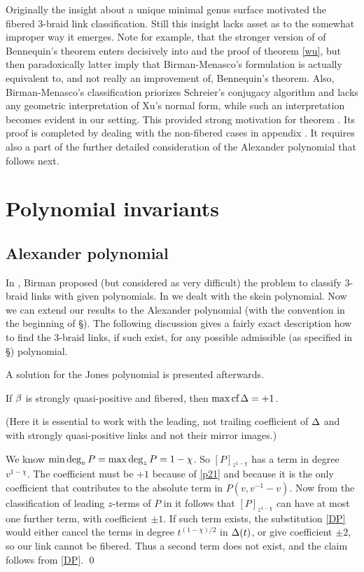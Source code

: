 Originally the insight about a unique minimal genus surface motivated
the fibered 3-braid link classification. Still this insight lacks
asset as to the somewhat improper way it emerges. Note for example,
that the stronger version of \cite{BirMen2} of Bennequin's theorem
enters decisively into \cite{Xu} and the proof of theorem \ref{wu},
but then paradoxically latter imply that Birman-Menasco's formulation
is actually equivalent to, and not really an improvement of,
Bennequin's theorem. Also, Birman-Menasco's classification
\cite{BirMen} priorizes Schreier's conjugacy algorithm and lacks
any geometric interpretation of Xu's normal form, while such an
interpretation becomes evident in our setting. This provided strong
motivation for theorem . Its proof is completed
by dealing with the non-fibered cases in appendix .
It requires also a part of the further detailed consideration of the
Alexander polynomial that follows next.

\section{Polynomial invariants}

\subsection{Alexander polynomial}

In \cite{Birman}, Birman proposed (but considered as very difficult)
the problem to classify 3-braid
links with given polynomials. In \cite{3br} we dealt with the skein
polynomial. Now we can extend our results to the Alexander polynomial
(with the convention in the beginning of \S{}).
The following discussion gives a fairly exact description how to
find the 3-braid links, if such exist, for any possible admissible
(as specified in \S{}) polynomial.

A solution for the Jones polynomial is presented afterwards.

\begin{lemma}
If $\beta$ is strongly quasi-positive and fibered, then $\max\text{\rm cf}\,\Delta=+1$.
\end{lemma}

(Here it is essential to work with the leading, not trailing
coefficient of $\Delta$ and with strongly quasi-positive links and
not their mirror images.)

\proof We know $\min\deg_vP=\max\deg_zP=1-\chi$. So $[P]_{z^{1-\chi}}$ has
a term in degree $v^{1-\chi}$. The coefficient must be $+1$
because of \eqref{p21} and because it is the only coefficient that
contributes to the absolute term in $P(v,v^{-1}-v)$. Now from
the classification of leading $z$-terms of $P$ in \cite{3br}
it follows that $[P]_{z^{1-\chi}}$ can have at most one further term,
with coefficient $\pm 1$. If such term exists, the substitution
\eqref{DP} would either cancel the terms
in degree $t^{(1-\chi)/2}$ in $\Delta(t)$, or give coefficient $\pm 2$,
so our link cannot be fibered. Thus a second term does not exist,
and the claim follows from \eqref{DP}. \qed

